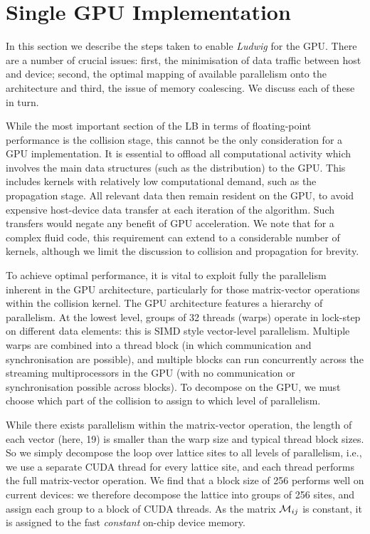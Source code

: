 \section{Single GPU Implementation}\label{ch14:sec:singlegpu}


In this section we describe the steps taken to enable \textit{Ludwig}
for the GPU. There are a number of crucial issues: first, the
minimisation of data traffic between host and device; second, the
optimal mapping of available parallelism onto the architecture and
third, the issue of memory coalescing. We discuss each of these in
turn.

While the most important section of the LB in terms of
floating-point performance is the collision stage, this cannot be the
only consideration for a GPU implementation. It is essential to
offload all computational activity which involves the main data
structures (such as the distribution) to the GPU. This includes
kernels with relatively low computational demand, such as the
propagation stage. All relevant data then remain resident on the GPU,
to avoid expensive host-device data transfer at each iteration of
the algorithm. Such transfers would negate any benefit of GPU
acceleration.  We note that for a complex fluid code, this requirement
can extend to a considerable number of kernels, although we limit the
discussion to collision and propagation for brevity.

To achieve optimal performance, it is vital to exploit fully the
parallelism inherent in the GPU architecture, particularly for
those matrix-vector operations within the collision kernel.
The GPU architecture features a hierarchy of parallelism. At the
lowest level, groups of 32 threads (warps) operate in
lock-step on different data elements: this is SIMD style vector-level
parallelism. Multiple warps are combined into a thread block (in which
communication and synchronisation are possible), and multiple blocks can
run concurrently across the streaming multiprocessors in the GPU
(with no communication or
synchronisation possible across blocks).  To decompose on the GPU, we
must choose which part of the collision to assign to which level of
parallelism.

While there exists parallelism within the matrix-vector operation, the
length of each vector (here, 19) is smaller than the warp size and typical
thread block sizes. So we simply decompose the loop over lattice sites
to all levels of parallelism, i.e., we use a separate CUDA thread for
every lattice site, and each thread performs the full matrix-vector
operation. We find that a block size of 256 performs well on current
devices: we therefore decompose
the lattice into groups of 256 sites, and assign each group to a block
of CUDA threads. As the matrix ${\cal M}_{ij}$ is constant, it is
assigned to the fast {\it constant} on-chip device memory.

